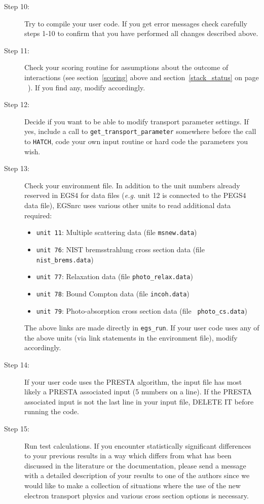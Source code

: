 \begin{description}
\item[Step 10:]
Try to compile your user code. If you get error messages
check carefully steps 1-10 to confirm that you have performed all
changes described above.

\item[Step 11:]
Check your scoring routine for
assumptions about the outcome of interactions
(see section~\ref{scoring} above and section~\ref{stack_status} on page
~\pageref{stack_status}). If you find any, modify accordingly.

\item[Step 12:]
Decide if you want to be able to modify transport parameter
settings. If yes, include a call to {\tt get\_transport\_parameter}
somewhere before the call to {\tt HATCH}, code your own input
routine or hard code the parameters you wish.

\item[Step 13:]
Check your environment file. In addition to the unit
numbers already reserved in EGS4 for data files ({\em e.g.} unit 12
is connected to the PEGS4 data file), EGSnrc uses various
other units to read additional data required:
\begin{itemize}
\item
{\tt unit 11}: Multiple scattering data (file {\tt msnew.data})
\item
{\tt unit 76}: NIST bremsstrahlung cross section data (file {\tt
nist\_brems.data})
\item
{\tt unit 77}: Relaxation data (file {\tt photo\_relax.data})
\item
{\tt unit 78}: Bound Compton data (file {\tt incoh.data})
\item
{\tt unit 79}: Photo-absorption cross section data (file {\tt
photo\_cs.data})
\end{itemize}
The above links are made directly in {\tt egs\_run}.
If your user code uses any of the above units (via link
statements in the environment file), modify accordingly.

\item[Step 14:]
If your user code uses the PRESTA algorithm, the
input file has most likely a PRESTA associated
input (5 numbers on a line). If the PRESTA associated
input is not the last line in your input file, DELETE
IT before running the code.

\item[Step 15:]
Run test calculations.
If you encounter statistically significant differences to your
previous results in a way which differs from what has been discussed in the
literature or the documentation, please send a message with a detailed description of
your results to one of the authors since we would like to
make a collection of situations where the use of the
new electron transport physics and various cross
section options is necessary.
\end{description}

